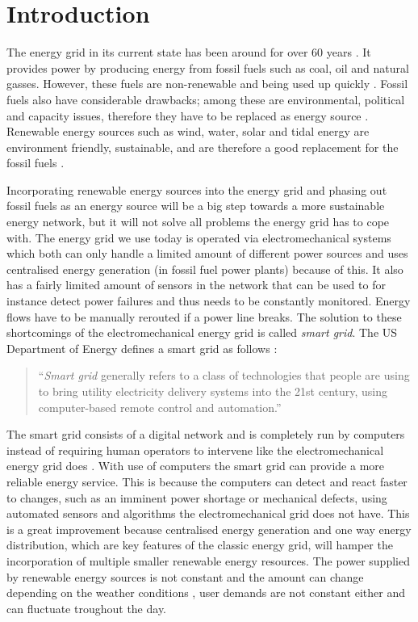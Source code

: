 \section{Introduction}\label{intro}
\acresetall
The energy grid in its current state has been around for over 60 years \cite{Wang2011}. It provides power by producing energy from fossil fuels such as coal, oil and natural gasses. However, these fuels are non-renewable and being used up quickly \cite{Wang2011}. Fossil fuels also have considerable drawbacks; among these are environmental, political and capacity issues, therefore they have to be replaced as energy source \cite{friedman2008hot}. Renewable energy sources such as wind, water, solar and tidal energy are environment friendly, sustainable, and are therefore a good replacement for the fossil fuels \cite{Tromly2001}.

Incorporating renewable energy sources into the energy grid and phasing out fossil fuels as an energy source will be a big step towards a more sustainable energy network, but it will not solve all problems the energy grid has to cope with. The energy grid we use today is operated via electromechanical systems which both can only handle a limited amount of different power sources and uses centralised energy generation (in fossil fuel power plants) because of this. It also has a fairly limited amount of sensors in the network that can be used to for instance detect power failures and thus needs to be constantly monitored. Energy flows have to be manually rerouted if a power line breaks. The solution to these shortcomings of the electromechanical energy grid is called \emph{smart grid}. The US Department of Energy defines a smart grid as follows \cite{doe}: 
 
\begin{quote}
``\emph{Smart grid} generally refers to a class of technologies that people are using to bring utility electricity delivery systems into the 21st century, using computer-based remote control and automation.''
\end{quote}

The smart grid consists of a digital network and is completely run by computers instead of requiring human operators to intervene like the electromechanical energy grid does \cite{Moslehi2010}. With use of computers the smart grid can provide a more reliable energy service. This is because the computers can detect and react faster to changes, such as an imminent power shortage or mechanical defects, using automated sensors and algorithms the electromechanical grid does not have. This is a great improvement because centralised energy generation and one way energy distribution, which are key features of the classic energy grid, will hamper the incorporation of multiple smaller renewable energy resources. The power supplied by renewable energy sources is not constant and the amount can change depending on the weather conditions \cite{RamchurnVitelingumRogersJennings2014}, user demands are not constant either and can fluctuate troughout the day.

